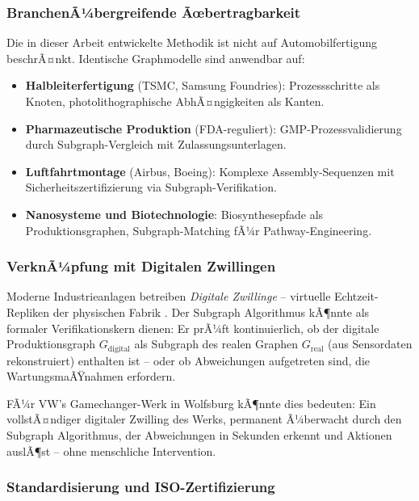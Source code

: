 ﻿\documentclass[a4paper,12pt]{article}
\theoremstyle{definition}
\begin{document}
\subsubsection{BranchenÃ¼bergreifende Ãœbertragbarkeit}

Die in dieser Arbeit entwickelte Methodik ist nicht auf Automobilfertigung beschrÃ¤nkt.
Identische Graphmodelle sind anwendbar auf:
\begin{itemize}
\item \textbf{Halbleiterfertigung} (TSMC, Samsung Foundries): Prozessschritte als Knoten,
  photolithographische AbhÃ¤ngigkeiten als Kanten.
\item \textbf{Pharmazeutische Produktion} (FDA-reguliert): GMP-Prozessvalidierung durch
  Subgraph-Vergleich mit Zulassungsunterlagen.
\item \textbf{Luftfahrtmontage} (Airbus, Boeing): Komplexe Assembly-Sequenzen mit
  Sicherheitszertifizierung via Subgraph-Verifikation.
\item \textbf{Nanosysteme und Biotechnologie}: Biosynthesepfade als Produktionsgraphen,
  Subgraph-Matching fÃ¼r Pathway-Engineering.
\end{itemize}

\subsubsection{VerknÃ¼pfung mit Digitalen Zwillingen}

Moderne Industrieanlagen betreiben \emph{Digitale Zwillinge} -- virtuelle Echtzeit-Repliken
der physischen Fabrik \cite{grieves2014digital}. Der Subgraph Algorithmus kÃ¶nnte als
formaler Verifikationskern dienen: Er prÃ¼ft kontinuierlich, ob der digitale Produktionsgraph
$G_{\mathrm{digital}}$ als Subgraph des realen Graphen $G_{\mathrm{real}}$ (aus Sensordaten
rekonstruiert) enthalten ist -- oder ob Abweichungen aufgetreten sind, die WartungsmaÃŸnahmen
erfordern.

FÃ¼r VW's Gamechanger-Werk in Wolfsburg kÃ¶nnte dies bedeuten: Ein vollstÃ¤ndiger
digitaler Zwilling des Werks, permanent Ã¼berwacht durch den Subgraph Algorithmus,
der Abweichungen in Sekunden erkennt und Aktionen auslÃ¶st -- ohne menschliche Intervention.

\subsubsection{Standardisierung und ISO-Zertifizierung}
\end{document}
